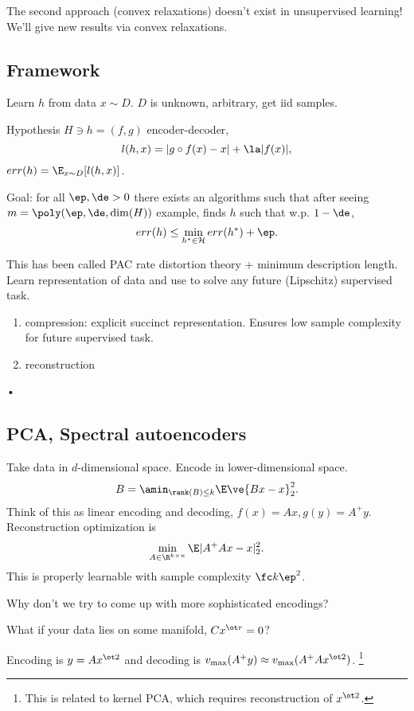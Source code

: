 The second approach (convex relaxations) doesn't exist in unsupervised learning!
 We'll give new results via convex relaxations.
 
\subsection{Framework}

Learn $h$ from data $x\sim D$. $D$ is unknown, arbitrary, get iid samples. 

Hypothesis $H\ni h=(f,g)$ encoder-decoder, $$l(h,x) = |g\circ f(x) - x|+\la |f(x)|,$$ 
$err(h) = \E_{x\sim D} [l(h,x)]$. %

Goal: for all $\ep, \de>0$ there exists an algorithms such that after seeing $m=\poly(\ep,\de,\dim(H))$ example, finds $h$ such that w.p. $1-\de$, 
$$err(h)\le \min_{h^*\in \cal H}err(h^*) + \ep.$$ 


This has been called PAC rate distortion theory + minimum description length. Learn representation of data and use to solve any future (Lipschitz) supervised task.
\begin{enumerate}
\item
compression: explicit succinct representation. Ensures low sample complexity for future supervised task.
\item
reconstruction
\end{enumerate}•

\subsection{PCA, Spectral autoencoders}

Take data in $d$-dimensional space. Encode in lower-dimensional space.
$$
B=\amin_{\rank(B)\le k} \E\ve{Bx-x}_2^2.
$$
Think of this as linear encoding and decoding, $f(x)=Ax, g(y)=A^+y$. Reconstruction optimization is
$$
\min_{A\in \R^{k\times n}} \E|A^+Ax-x|_2^2.
$$
This is properly learnable with sample complexity $\fc k{\ep^2}$. 

Why don't we try to come up with more sophisticated encodings?

What if your data lies on some manifold, $Cx^{\ot r}=0$?

Encoding is $y=Ax^{\ot 2}$ and decoding is $v_{\max}(A^+y)\approx v_{\max}(A^+Ax^{\ot 2})$. 
\footnote{This is related to kernel PCA, which requires reconstruction of $x^{\ot 2}$.} %

